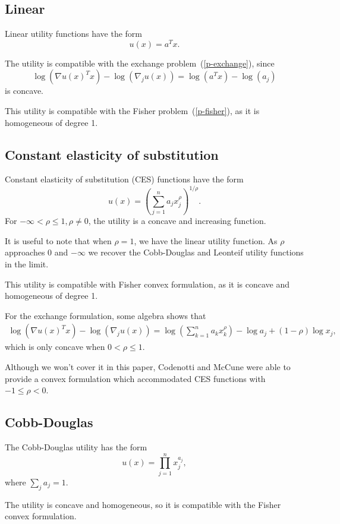 \documentclass[12pt]{article}
\begin{document}
\subsection{Linear}

Linear utility functions have the form
\[
u(x) = a^T x.
\]

The utility is compatible with the exchange problem~(\ref{p-exchange}),
since
\[
\log(\nabla u(x)^T x) - \log(\nabla_j u(x))  = \log(a^T x) - \log(a_j)
\]
is concave.

This utility is compatible with the Fisher problem~(\ref{p-fisher}), as it is homogeneous of degree 1.


\subsection{Constant elasticity of substitution}
Constant elasticity of substitution (CES) functions have the form
\[
u(x) = \left(\sum_{j=1}^n a_j x_j^\rho \right)^{1/\rho}.
\]
For $-\infty < \rho \leq 1, \rho \neq 0$, the utility is a concave and
increasing function.

It is useful to note that when $\rho = 1$, we have the linear utility function. As $\rho$ approaches $0$ and $-\infty$ we recover the Cobb-Douglas and Leonteif
utility functions in the limit. %

This utility is compatible with Fisher convex formulation, as it is concave and homogeneous of degree 1.

For the exchange formulation, some algebra shows that 
\begin{align*}
\log(\nabla u(x)^T x) - \log(\nabla_j u(x)) =
\log\left(\sum_{k=1}^n a_k x_k^\rho \right) - \log a_j + (1-\rho) \log x_j,
\end{align*}
which is only concave when $0 < \rho \leq 1$.

Although we won't cover it in this paper, Codenotti and McCune \cite{codenotti2005marketCES} were able to provide a convex formulation which accommodated
CES functions with $-1 \leq \rho < 0$.

\subsection{Cobb-Douglas}
The Cobb-Douglas utility has the form
\[
u(x) = \prod_{j=1}^{n} x_j^{a_j},
\]
where $\sum_j a_j = 1$.


The utility is concave and homogeneous, so it is compatible with the Fisher
convex formulation.
\end{document}
